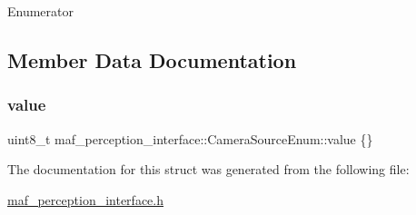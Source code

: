 \begin{DoxyEnumFields}{Enumerator}
\end{DoxyEnumFields}


\subsection{Member Data Documentation}
\mbox{\label{structmaf__perception__interface_1_1CameraSourceEnum_a363bc43f622e3b5fa73e9f5b30f0737c}} 
\subsubsection{\texorpdfstring{value}{value}}
{\footnotesize\ttfamily uint8\+\_\+t maf\+\_\+perception\+\_\+interface\+::\+Camera\+Source\+Enum\+::value \{\}}



The documentation for this struct was generated from the following file\+:\begin{DoxyCompactItemize}
\item 
\hyperlink{maf__perception__interface_8h}{maf\+\_\+perception\+\_\+interface.\+h}\end{DoxyCompactItemize}
